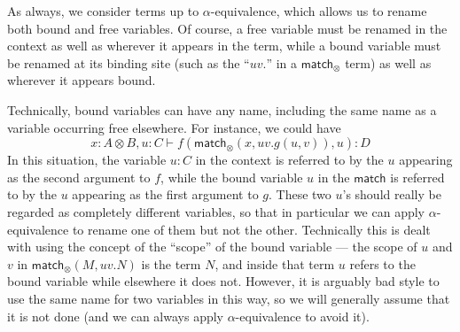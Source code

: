 \documentclass{book}
\let\types\vdash
\def\match{\mathsf{match}}
\let\tensor\otimes
\begin{document}
As always, we consider terms up to $\alpha$-equivalence, which allows us to rename both bound and free variables.
Of course, a free variable must be renamed in the context as well as wherever it appears in the term, while a bound variable must be renamed at its binding site (such as the ``$uv.$'' in a $\match_\tensor$ term) as well as wherever it appears bound.

Technically, bound variables can have any name, including the same name as a variable occurring free elsewhere.
For instance, we could have
\[ x:A\tensor B, u:C \types f(\match_\tensor(x,uv.g(u,v)),u):D \]
In this situation, the variable $u:C$ in the context is referred to by the $u$ appearing as the second argument to $f$, while the bound variable $u$ in the $\match$ is referred to by the $u$ appearing as the first argument to $g$.
These two $u$'s should really be regarded as completely different variables, so that in particular we can apply $\alpha$-equivalence to rename one of them but not the other.
Technically this is dealt with using the concept of the ``scope'' of the bound variable --- the scope of $u$ and $v$ in $\match_\tensor(M,uv.N)$ is the term $N$, and inside that term $u$ refers to the bound variable while elsewhere it does not.
However, it is arguably bad style to use the same name for two variables in this way, so we will generally assume that it is not done (and we can always apply $\alpha$-equivalence to avoid it).
\end{document}
